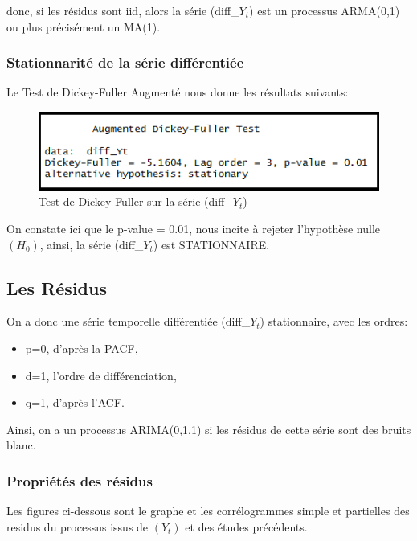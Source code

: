 \documentclass{article}
\begin{document}
donc, si les résidus sont iid, alors la série (diff{\_}$Y_t$) est un processus ARMA(0,1) ou plus précisément un MA(1).

\subsubsection{Stationnarité de la série différentiée}
Le Test de Dickey-Fuller Augmenté nous donne les résultats suivants:

\begin{figure}[h!]
\includegraphics[width=\linewidth]{images/diff_Yt_adf.png}
\caption{Test de Dickey-Fuller sur la série (diff{\_}$Y_t$)}
\label{fig:diff_Yt_adf}
\end{figure}

On constate ici que le p-value = 0.01, nous incite à rejeter l'hypothèse nulle $(H_0)$, ainsi, la série (diff{\_}$Y_t$) est STATIONNAIRE.

\subsection{Les Résidus}
On a donc une série temporelle différentiée (diff{\_}$Y_t$) stationnaire, avec les ordres:
\begin{itemize}
\item p=0, d'après la PACF,
\item d=1, l'ordre de différenciation, 
\item q=1, d'après l'ACF.
\end{itemize}

Ainsi, on a un processus ARIMA(0,1,1) si les résidus de cette série sont des bruits blanc.

\newpage

\subsubsection{Propriétés des résidus}
Les figures ci-dessous sont le graphe et les corrélogrammes simple et partielles des residus du processus issus de $(Y_t)$ et des études précédents.
\end{document}
